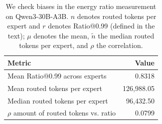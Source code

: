 \begin{table}
    \setlength{\abovecaptionskip}{3pt}
    \caption{We check biases in the energy ratio measurement on Qwen3-30B-A3B.
    $n$ denotes routed tokens per expert and $r$ denotes Ratio@0.99
    (defined in the text); $\mu$ denotes the mean, $\tilde{n}$ the median
    routed tokens per expert, and $\rho$ the correlation.}
    \label{tab:moe_bias_checks}
    \centering
    \begin{tabularx}{\linewidth}{@{}Xr@{}}
    \toprule
    Metric & Value \\
    \midrule
    Mean Ratio@0.99 across experts & 0.8318 \\
    Mean routed tokens per expert & 126{,}988.05 \\
    Median routed tokens per expert & 96{,}432.50 \\
    $\rho$ amount of routed tokens vs. ratio & 0.0799 \\
    \bottomrule
    \end{tabularx}
\end{table}
